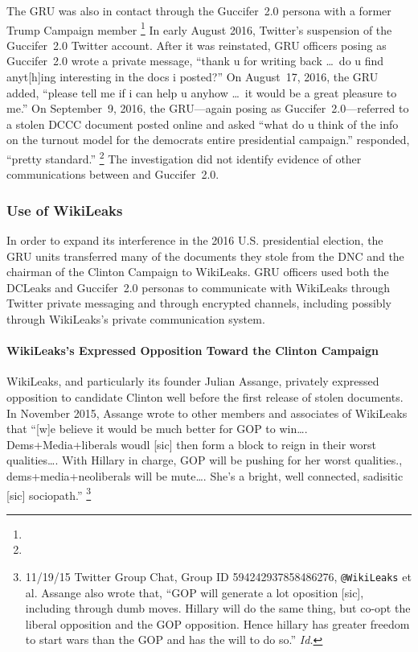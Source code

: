 The GRU was also in contact through the Guccifer~2.0 persona with  a former Trump Campaign member %
\footnote{}
In early August 2016,  Twitter's suspension of the Guccifer~2.0 Twitter account.
After it was reinstated, GRU officers posing as Guccifer~2.0 wrote  a private message, ``thank u for writing back \dots\ do u find anyt[h]ing interesting in the docs i posted?''
On August~17, 2016, the GRU added, ``please tell me if i can help u anyhow \dots\ it would be a great pleasure to me.''
On September~9, 2016, the GRU---again posing as Guccifer~2.0---referred to a stolen DCCC document posted online and asked  ``what do u think of the info on the turnout model for the democrats entire presidential campaign.''
 responded, ``pretty standard.''%
\footnote{}
The investigation did not identify evidence of other communications between  and Guccifer~2.0.

\subsubsection{Use of WikiLeaks}

In order to expand its interference in the 2016 U.S. presidential election, the GRU units transferred many of the documents they stole from the DNC and the chairman of the Clinton Campaign to WikiLeaks.
GRU officers used both the DCLeaks and Guccifer~2.0 personas to communicate with WikiLeaks through Twitter private messaging and through encrypted channels, including possibly through WikiLeaks's private communication system.

\paragraph{WikiLeaks's Expressed Opposition Toward the Clinton Campaign}

WikiLeaks, and particularly its founder Julian Assange, privately expressed opposition to candidate Clinton well before the first release of stolen documents.
In November 2015, Assange wrote to other members and associates of WikiLeaks that ``[w]e believe it would be much better for GOP to win\dots.
Dems+Media+liberals woudl [sic] then form a block to reign in their worst qualities\dots.
With Hillary in charge, GOP will be pushing for her worst qualities., dems+media+neoliberals will be mute\dots.
She's a bright, well connected, sadisitic [sic] sociopath.''%
\footnote{11/19/15 Twitter Group Chat, Group ID 594242937858486276, \verb+@WikiLeaks+ et al.
Assange also wrote that, ``GOP will generate a lot oposition [sic], including through dumb moves.
Hillary will do the same thing, but co-opt the liberal opposition and the GOP opposition.
Hence hillary has greater freedom to start wars than the GOP and has the will to do so.'' \textit{Id.}}

